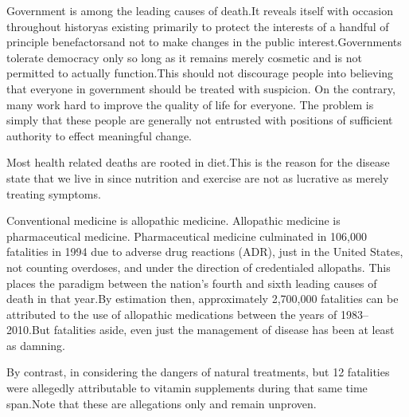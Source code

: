 
Government is among the leading causes of death. It reveals itself with occasion throughout history\footnotecite[wilson2007] as existing primarily to protect the interests of a handful of principle benefactors\footnotecite[bowie2012] and not to make changes in the public interest. Governments tolerate democracy only so long as it remains merely cosmetic and is not permitted to actually function. This should not discourage people into believing that everyone in government should be treated with suspicion. On the contrary, many work hard to improve the quality of life for everyone. The problem is simply that these people are generally not entrusted with positions of sufficient authority to effect meaningful change.


Most health related deaths are rooted in diet. This is the reason for the disease state that we live in since nutrition and exercise are not as lucrative as merely treating symptoms.


Conventional medicine is allopathic medicine. Allopathic medicine is pharmaceutical medicine. Pharmaceutical medicine culminated in 106,000 fatalities in 1994 due to adverse drug reactions (ADR), just in the United States, not counting overdoses, and under the direction of credentialed allopaths. This places the paradigm between the nation's fourth and sixth leading causes of death in that year. By estimation then, approximately 2,700,000 fatalities can be attributed to the use of allopathic medications between the years of 1983--2010. But fatalities aside, even just the management of disease has been at least as damning.\footnotecite[leape2000]

By contrast, in considering the dangers of natural treatments, but 12 fatalities were allegedly attributable to vitamin supplements during that same time span. Note that these are allegations only and remain unproven. 

